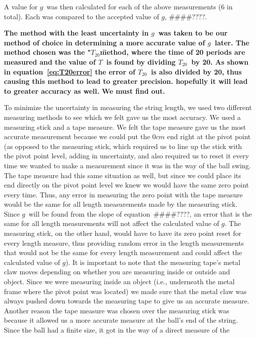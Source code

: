 \documentclass[iop,numberedappendix,appendixfloats]{emulateapj}
\def\g{$g$}
\def\T{$T$}
\def\Ttwen{$T_{20}$}
\def\fillin{\#\#\#\#????}
\begin{document}
A value for \g\ was then calculated for each of the above measurements (6 in 
total). Each was compared to the accepted value of \g, \fillin.  {\bf The 
method with the least uncertainty in \g\ was taken to be our method of choice 
in determining a more accurate value of \g\ later.  The method chosen was the 
"\Ttwen\" method, where the time of 20 periods are measured and the value of 
\T\ is found by dividing \Ttwen\ by 20.  As shown in 
equation~\ref{eq:T20error} the error of \Ttwen\ is also divided by 20, thus 
causing this method to lead to greater precision.  {\bf hopefully it will lead 
to greater accuracy as well.  We must find out}. 

To minimize the uncertainty in measuring the string length, we used two 
different measuring methods to see which we felt gave us the most accuracy. 
We used a measuring stick and a tape measure.  We felt the tape measure gave 
us the most accurate measurement because we could put the $0cm$ end right at 
the pivot point (as opposed to the measuring stick, which required us to line 
up the stick with the pivot point level, adding in uncertainty, and also 
required us to reset it every time we wanted to make a measurement since it 
was in the way of the ball swing. The tape measure had this same situation 
as well, but since we could place its end directly on the pivot point level 
we knew we would have the same zero point every time. Thus, any error in 
measuring the zero point with the tape measure would be the same for all 
length measurements made by the measuring stick.  Since \g\ will be found 
from the slope of equation~\fillin, an error that is the same for all length 
measurements will not affect the calculated value of \g.  The measuring stick, 
on the other hand, would have to have its zero point reset for every length 
measure, thus providing random error in the length measurements that would 
not be the same for every length measurement and could affect the calculated 
value of \g).  It is important to note that the measuring tape's metal claw 
moves depending on whether you are measuring inside or outside and object. 
Since we were measuring inside an object (i.e., underneath the metal frame 
where the pivot point was located) we made sure that the metal claw was always 
pushed down towards the measuring tape to give us an accurate measure.  
Another reason the tape measure was chosen over the measuring stick was 
because it allowed us a more accurate measure at the ball's end of the string. 
Since the ball had a finite size, it got in the way of a direct measure of the 
}
\end{document}
